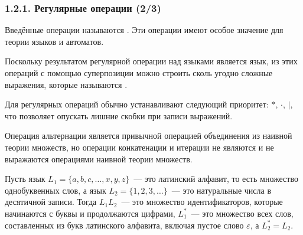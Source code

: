 \begin{frame}
\frametitle{1.2.1. Регулярные операции (2/3)}

Введённые операции называются
. Эти операции имеют
особое значение для теории языков и автоматов.

\medskip
Поскольку результатом регулярной 
операции над языками является язык,
из этих операций с помощью суперпозиции 
можно строить
сколь угодно сложные  выражения,
которые называются . 

\medskip
Для регулярных операций обычно устанавливают следующий приоритет:
$*$, $\cdot$, $|$, что позволяет опускать лишние скобки при записи
выражений.

\begin{remark}
Операция альтернации является
привычной операцией объединения из
наивной теории множеств,
но операции конкатенации и итерации
не являются 
и не выражаются операциями наивной теории множеств. 
\end{remark}

\begin{examples}
Пусть язык 
$L_1 =\{a,b,c,\dots,x,y,z\}$~--- это латинский алфавит, то есть множество однобуквенных слов,
а язык 
$L_2=\{1,2,3,\dots\}$~--- это натуральные
числа в десятичной записи.
Тогда $L_1 L_2$~--- это множество 
идентификаторов, которые начинаются
с буквы и продолжаются цифрами,
$L_1^*$~--- это множество всех 
слов, составленных из букв латинского алфавита,
включая пустое слово $\varepsilon$,
а $L_2^* = L_2$.
\end{examples}

\end{frame}


